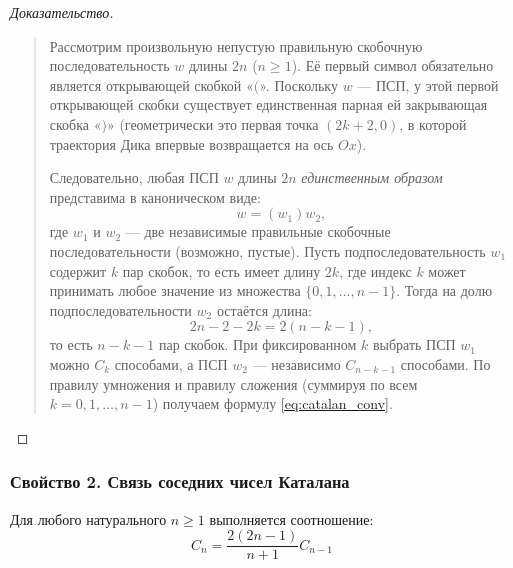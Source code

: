 \begin{proof}[Доказательство]~\\
    \begin{quote}
        Рассмотрим произвольную непустую правильную скобочную 
        последовательность $w$ длины $2n$ ($n \ge 1$). Её первый символ 
        обязательно является открывающей скобкой «$($». Поскольку $w$ --- 
        ПСП, у этой первой открывающей скобки существует единственная 
        парная ей закрывающая скобка «$)$» (геометрически это первая точка 
        $(2k + 2, 0)$, в которой траектория Дика впервые возвращается на 
        ось $Ox$).

        Следовательно, любая ПСП $w$ длины $2n$ \emph{единственным образом} 
        представима в каноническом виде:
        \[
            w = (w_1) w_2,
        \]
        где $w_1$ и $w_2$ --- две независимые правильные скобочные 
        последовательности (возможно, пустые). Пусть подпоследовательность 
        $w_1$ содержит $k$ пар скобок, то есть имеет длину $2k$, где индекс 
        $k$ может принимать любое значение из множества $\{0, 1, \dots, n - 1\}$. 
        Тогда на долю подпоследовательности $w_2$ остаётся длина:
        \[
            2n - 2 - 2k = 2(n - k - 1),
        \]
        то есть $n - k - 1$ пар скобок. При фиксированном $k$ выбрать ПСП 
        $w_1$ можно $C_k$ способами, а ПСП $w_2$ --- независимо $C_{n-k-1}$ 
        способами. По правилу умножения и правилу сложения (суммируя по 
        всем $k = 0, 1, \dots, n - 1$) получаем формулу \eqref{eq:catalan_conv}.
    \end{quote}
\end{proof}

\subsubsection{Свойство 2. Связь соседних чисел Каталана}

\begin{proposition}
    Для любого натурального $n \ge 1$ выполняется соотношение:
    \begin{equation} \label{eq:catalan_ratio}
        C_n = \frac{2(2n - 1)}{n + 1} C_{n-1} \tag{5}
    \end{equation}
\end{proposition}

